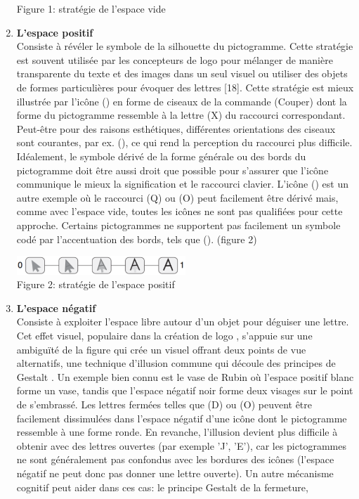 \documentclass[12pt,a4paper]{article}
\begin{document}
\begin{enumerate}
\begin{center}
	Figure 1: stratégie de l’espace vide
\end{center}
\item {\large \textbf{L’espace positif}}\\
Consiste à révéler le symbole de la silhouette du pictogramme. Cette stratégie est souvent utilisée par les concepteurs de logo pour mélanger de manière transparente du texte et des images dans un seul visuel ou utiliser des objets de formes particulières pour évoquer des lettres [18]. Cette stratégie est mieux illustrée par l'icône () en forme de ciseaux de la commande (Couper) dont la forme du
pictogramme ressemble à la lettre (X) du raccourci correspondant. Peut-être pour des raisons esthétiques, différentes orientations des ciseaux sont courantes, par ex. (), ce qui rend la perception
du raccourci plus difficile. Idéalement, le symbole dérivé de la forme générale ou des  bords du pictogramme doit être aussi droit que possible pour s'assurer que l'icône communique le mieux la signification et le raccourci clavier. L'icône () est un autre exemple où le raccourci (Q) ou (O) peut
facilement être dérivé mais, comme avec l'espace vide, toutes les icônes ne sont pas qualifiées pour cette approche. Certains pictogrammes ne supportent pas facilement un symbole codé par l'accentuation des bords, tels que (). (figure 2)
\begin{center}
	\includegraphics[width=0.5\textwidth]{T2.png}\\
	Figure 2: stratégie de l’espace positif
\end{center}
\item {\large \textbf{L’espace négatif}}\\
Consiste à exploiter l'espace libre autour d'un objet pour déguiser une lettre. Cet effet visuel, populaire dans la création de logo \cite{18}, s’appuie sur une ambiguïté de la figure qui crée un visuel offrant deux points de vue alternatifs, une technique d'illusion commune qui découle des principes
de Gestalt \cite{19}. Un exemple bien connu est le vase de Rubin \cite{20} où l'espace positif blanc forme un vase, tandis que l'espace négatif noir forme deux visages sur le point de s’embrassé. Les lettres fermées telles que (D) ou (O) peuvent être facilement dissimulées dans l'espace négatif d'une icône dont le pictogramme ressemble à une forme ronde. En revanche, l'illusion devient plus difficile à obtenir avec des lettres ouvertes (par exemple 'J', 'E'), car les pictogrammes ne sont généralement pas confondus avec les bordures des icônes (l'espace négatif ne peut donc pas donner une lettre ouverte). Un autre mécanisme cognitif peut aider dans ces cas: le principe Gestalt de la fermeture,

\end{enumerate}
\end{document}
